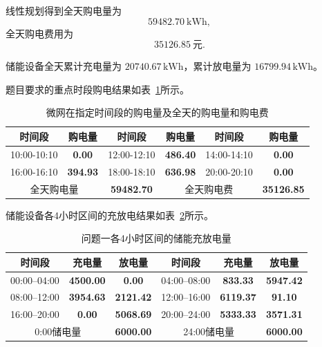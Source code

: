 线性规划得到全天购电量为
\[
\boxed{59482.70\ \mathrm{kWh}},
\]
全天购电费用为
\[
\boxed{35126.85\ \text{元}}.
\]

储能设备全天累计充电量为 \(20740.67\,\mathrm{kWh}\)，累计放电量为 \(16799.94\,\mathrm{kWh}\)。

题目要求的重点时段购电结果如表~\ref{tab:q1_purchase_result}所示。

\begin{table}[H]
    \centering
    \caption{微网在指定时间段的购电量及全天的购电量和购电费 }
    \label{tab:q1_purchase_result}
    \begin{tabular}{|c|c|c|c|c|c|}
        \hline
        时间段 & 购电量 & 时间段 & 购电量 & 时间段 & 购电量 \\
        \hline
        10:00-10:10 & \textbf{0.00} & 12:00-12:10 & \textbf{486.40} & 14:00-14:10 & \textbf{0.00} \\
        \hline
        16:00-16:10 & \textbf{394.93} & 18:00-18:10 & \textbf{636.98} & 20:00-20:10 & \textbf{0.00} \\
        \hline
        \multicolumn{2}{|c|}{全天购电量} & \multicolumn{1}{c|}{\textbf{59482.70}} & \multicolumn{2}{c|}{全天购电费} & \multicolumn{1}{c|}{\textbf{35126.85}}\\
        \hline
    \end{tabular}
\end{table}

储能设备各4小时区间的充放电结果如表~\ref{tab:q1_storage_result}所示。

\begin{table}[H]
    \centering
    \caption{问题一各4小时区间的储能充放电量}
    \label{tab:q1_storage_result}
    \begin{tabular}{|c|c|c|c|c|c|}
        \hline
        时间段 & 充电量 & 放电量 & 时间段 & 充电量 & 放电量 \\
        \hline
        00:00--04:00 & \textbf{4500.00} & \textbf{0.00} & 04:00--08:00 & \textbf{833.33} & \textbf{5947.42} \\
        \hline
        08:00--12:00 & \textbf{3954.63} & \textbf{2121.42} & 12:00--16:00 & \textbf{6119.37} & \textbf{91.10} \\
        \hline
        16:00--20:00 & \textbf{0.00} & \textbf{5068.69} & 20:00--24:00 & \textbf{5333.33} & \textbf{3571.31} \\
        \hline
        \multicolumn{2}{|c|}{0:00储电量} & \multicolumn{1}{|c|}{\textbf{6000.00}} & \multicolumn{2}{c|}{24:00储电量} & \multicolumn{1}{c|}{\textbf{6000.00}}\\
        \hline
    \end{tabular}
\end{table}

